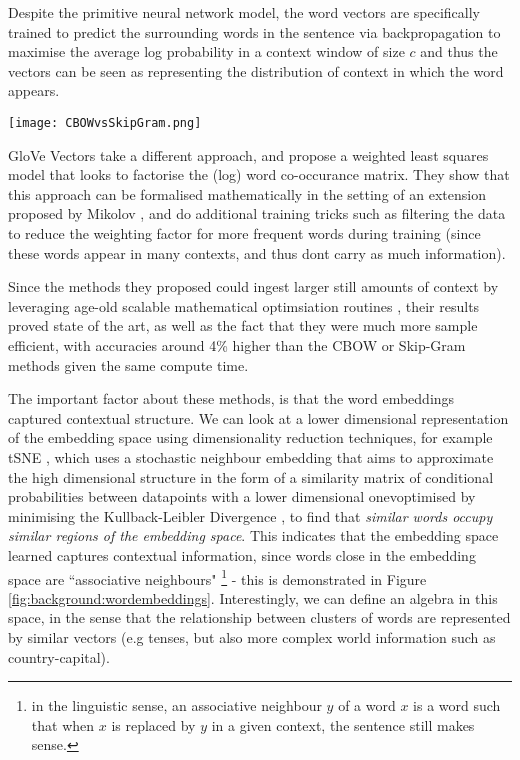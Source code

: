 {{Despite the primitive neural network model, the word vectors are specifically trained to predict the surrounding words in the sentence via backpropagation to maximise the average log probability in a context window of size $c$ and thus the vectors can be seen as representing the distribution of context in which the word appears.

\begin{center}
	\texttt{[image: CBOWvsSkipGram.png]}
	\label{fig:background:SkipGramvsCBOW}
\end{center}

GloVe Vectors \cite{Pennington} take a different approach, and propose a weighted least squares model that looks to factorise the (log) word co-occurance matrix. They show that this approach can be formalised mathematically in the setting of an extension proposed by Mikolov \cite{Mikolov}, and do additional training tricks such as filtering the data to reduce the weighting factor for more frequent words during training (since these words appear in many contexts, and thus dont carry as much information).

Since the methods they proposed could ingest larger still amounts of context by leveraging age-old scalable mathematical optimsiation routines \cite{Pennington}, their results proved state of the art, as well as the fact that they were much more sample efficient, with accuracies around 4\% higher than the CBOW or Skip-Gram methods given the same compute time.

The important factor about these methods, is that the word embeddings captured contextual structure. We can look at a lower dimensional representation of the embedding space using dimensionality reduction techniques, for example tSNE \cite{VanDerMaaten2008}, which uses a stochastic neighbour embedding that aims to approximate the high dimensional structure in the form of a similarity matrix of conditional probabilities between datapoints with a lower dimensional onevoptimised by minimising the Kullback-Leibler Divergence \cite{Kullback1951}, to find that \textit{similar words occupy similar regions of the embedding space}. This indicates that the embedding space learned captures contextual information, since words close in the embedding space are ``associative neighbours" \footnote{in the linguistic sense, an associative neighbour $y$ of a word $x$ is a word such that when $x$ is replaced by $y$ in a given context, the sentence still makes sense.} - this is demonstrated in Figure \ref{fig:background:wordembeddings}. Interestingly, we can define an algebra in this space, in the sense that the relationship between clusters of words are represented by similar vectors (e.g tenses, but also more complex world information such as country-capital).

}}
